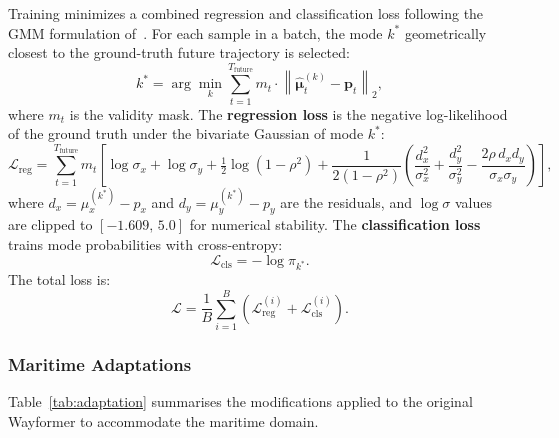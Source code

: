 \documentclass[12pt, a4paper]{article}
\begin{document}
Training minimizes a combined regression and classification loss
following the GMM formulation of~\citet{nayakanti2022wayformer}.
For each sample in a batch, the mode $k^*$ geometrically closest
to the ground-truth future trajectory is selected:
\begin{equation}
    k^* = \arg\min_{k} \sum_{t=1}^{T_{\text{future}}}
    m_t \cdot \left\| \hat{\boldsymbol{\mu}}_t^{(k)} - \mathbf{p}_t \right\|_2,
    \label{eq:nearest_mode}
\end{equation}
where $m_t$ is the validity mask. The \textbf{regression loss} is the
negative log-likelihood of the ground truth under the bivariate Gaussian
of mode $k^*$:
\begin{equation}
    \mathcal{L}_{\text{reg}} = \sum_{t=1}^{T_{\text{future}}} m_t \left[
    \log\sigma_x + \log\sigma_y + \tfrac{1}{2}\log(1 - \rho^2)
    + \frac{1}{2(1-\rho^2)} \left(
        \frac{d_x^2}{\sigma_x^2} + \frac{d_y^2}{\sigma_y^2}
        - \frac{2\rho\, d_x d_y}{\sigma_x \sigma_y}
    \right)\right],
    \label{eq:reg_loss}
\end{equation}
where $d_x = \mu_x^{(k^*)} - p_x$ and $d_y = \mu_y^{(k^*)} - p_y$
are the residuals, and $\log\sigma$ values are clipped to
$[-1.609,\, 5.0]$ for numerical stability. The \textbf{classification
loss} trains mode probabilities with cross-entropy:
\begin{equation}
    \mathcal{L}_{\text{cls}} = -\log \pi_{k^*}.
    \label{eq:cls_loss}
\end{equation}
The total loss is:
\begin{equation}
    \mathcal{L} = \frac{1}{B}\sum_{i=1}^{B}
    \left(\mathcal{L}_{\text{reg}}^{(i)} + \mathcal{L}_{\text{cls}}^{(i)}\right).
    \label{eq:total_loss}
\end{equation}

\subsubsection{Maritime Adaptations}
\label{sec:adaptations}

Table~\ref{tab:adaptation} summarises the modifications applied to the
original Wayformer to accommodate the maritime domain.
\end{document}
